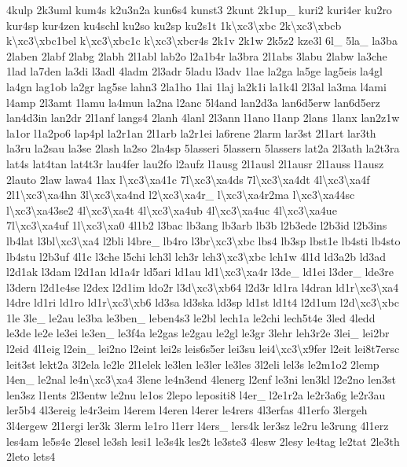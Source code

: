 \begin{DoxyCompactItemize}
4kulp 2k3uml kum4s k2u3n2a kun6s4 kunst3 2kunt 2k1up\-\_\- kuri2 kuri4er ku2ro kur4sp kur4zen ku4schl ku2so ku2sp ku2s1t 1k\textbackslash{}xc3\textbackslash{}xbc 2k\textbackslash{}xc3\textbackslash{}xbcb k\textbackslash{}xc3\textbackslash{}xbc1bel k\textbackslash{}xc3\textbackslash{}xbc1c k\textbackslash{}xc3\textbackslash{}xbcr4s 2k1v 2k1w 2k5z2 kze3l 6l\-\_\- 5la\-\_\- la3ba 2laben 2labf 2labg 2labh 2l1abl lab2o l2a1b4r la3bra 2l1abs 3labu 2labw la3che 1lad la7den la3di l3adl 4ladm 2l3adr 5ladu l3adv 1lae la2ga la5ge lag5eis la4gl la4gn lag1ob la2gr lag5se lahn3 2la1ho 1lai 1laj la2k1i la1k4l 2l3al la3ma l4ami l4amp 2l3amt 1lamu la4mun la2na l2anc 5l4and lan2d3a lan6d5erw lan6d5erz lan4d3in lan2dr 2l1anf langs4 2lanh 4lanl 2l3ann l1ano l1anp 2lans 1lanx lan2z1w la1or l1a2po6 lap4pl la2r1an 2l1arb la2r1ei la6rene 2larm lar3st 2l1art lar3th la3ru la2sau la3se 2lash la2so 2la4sp 5lasseri 5lassern 5lassers lat2a 2l3ath la2t3ra lat4s lat4tan lat4t3r lau4fer lau2fo l2aufz l1ausg 2l1ausl 2l1ausr 2l1auss l1ausz 2lauto 2law lawa4 1lax l\textbackslash{}xc3\textbackslash{}xa41c 7l\textbackslash{}xc3\textbackslash{}xa4ds 7l\textbackslash{}xc3\textbackslash{}xa4dt 4l\textbackslash{}xc3\textbackslash{}xa4f 2l1\textbackslash{}xc3\textbackslash{}xa4hn 3l\textbackslash{}xc3\textbackslash{}xa4nd l2\textbackslash{}xc3\textbackslash{}xa4r\-\_\- l\textbackslash{}xc3\textbackslash{}xa4r2ma l\textbackslash{}xc3\textbackslash{}xa44sc l\textbackslash{}xc3\textbackslash{}xa43se2 4l\textbackslash{}xc3\textbackslash{}xa4t 4l\textbackslash{}xc3\textbackslash{}xa4ub 4l\textbackslash{}xc3\textbackslash{}xa4uc 4l\textbackslash{}xc3\textbackslash{}xa4ue 7l\textbackslash{}xc3\textbackslash{}xa4uf 1l\textbackslash{}xc3\textbackslash{}xa0 4l1b2 l3bac lb3ang lb3arb lb3b l2b3ede l2b3id l2b3ins lb4lat l3bl\textbackslash{}xc3\textbackslash{}xa4 l2bli l4bre\-\_\- lb4ro l3br\textbackslash{}xc3\textbackslash{}xbc lbs4 lb3sp lbst1e lb4sti lb4sto lb4stu l2b3uf 4l1c l3che l5chi lch3l lch3r lch3\textbackslash{}xc3\textbackslash{}xbc lch1w 4l1d ld3a2b ld3ad l2d1ak l3dam l2d1an ld1a4r ld5ari ld1au ld1\textbackslash{}xc3\textbackslash{}xa4r l3de\-\_\- ld1ei l3der\-\_\- lde3re l3dern l2d1e4se l2dex l2d1im ldo2r l3d\textbackslash{}xc3\textbackslash{}xb64 l2d3r ld1ra l4dran ld1r\textbackslash{}xc3\textbackslash{}xa4 l4dre ld1ri ld1ro ld1r\textbackslash{}xc3\textbackslash{}xb6 ld3sa ld3ska ld3sp ld1st ld1t4 l2d1um l2d\textbackslash{}xc3\textbackslash{}xbc 1le 3le\-\_\- le2au le3ba le3ben\-\_\- leben4s3 le2bl lech1a le2chi lech5t4e 3led 4ledd le3de le2e le3ei le3en\-\_\- le3f4a le2gas le2gau le2gl le3gr 3lehr leh3r2e 3lei\-\_\- lei2br l2eid 4l1eig l2ein\-\_\- lei2no l2eint lei2s leis6s5er lei3su lei4\textbackslash{}xc3\textbackslash{}x9fer l2eit lei8t7ersc leit3st lekt2a 3l2ela le2le 2l1elek le3len le3ler le3les 3l2eli lel3s le2m1o2 2lemp l4en\-\_\- le2nal le4n\textbackslash{}xc3\textbackslash{}xa4 3lene le4n3end 4lenerg l2enf le3ni len3kl l2e2no len3st len3sz l1ents 2l3entw le2nu le1os 2lepo lepositi8 l4er\-\_\- l2e1r2a le2r3a6g le2r3au ler5b4 4l3ereig le4r3eim l4erem l4eren l4erer le4rers 4l3erfas 4l1erfo 3lergeh 3l4ergew 2l1ergi ler3k 3lerm le1ro l1err l4ers\-\_\- lers4k ler3sz le2ru le3rung 4l1erz les4am le5s4e 2lesel le3sh lesi1 le3s4k les2t le3ste3 4lesw 2lesy le4tag le2tat 2le3th 2leto lets4 
\end{DoxyCompactItemize}
